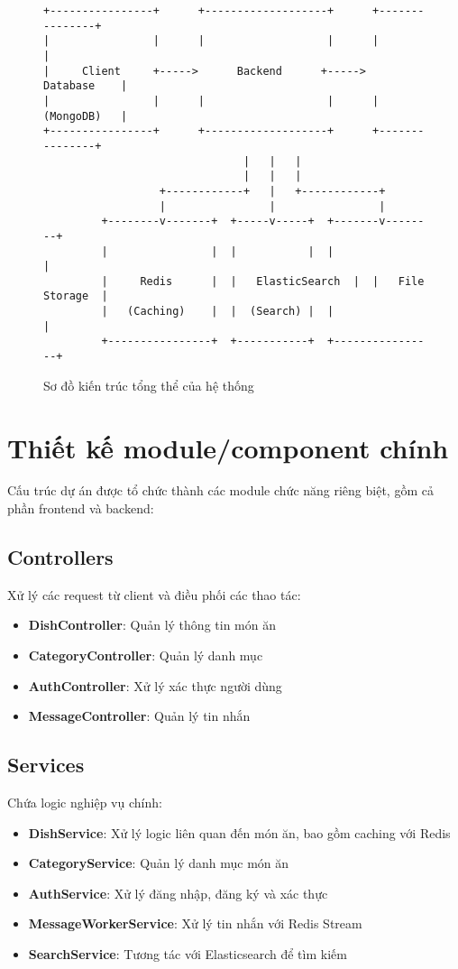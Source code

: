\begin{figure}[H]
\centering
\begin{verbatim}
+----------------+      +-------------------+      +---------------+
|                |      |                   |      |               |
|     Client     +----->      Backend      +----->    Database    |
|                |      |                   |      |   (MongoDB)   |
+----------------+      +-------------------+      +---------------+
                               |   |   |
                               |   |   |
                  +------------+   |   +------------+
                  |                |                |
         +--------v-------+  +-----v-----+  +-------v--------+
         |                |  |           |  |                |
         |     Redis      |  |   ElasticSearch  |  |   File Storage  |
         |   (Caching)    |  |  (Search) |  |                |
         +----------------+  +-----------+  +----------------+
\end{verbatim}
\caption{Sơ đồ kiến trúc tổng thể của hệ thống}
\end{figure}

\section{Thiết kế module/component chính}
Cấu trúc dự án được tổ chức thành các module chức năng riêng biệt, gồm cả phần frontend và backend:

\subsection{Controllers}
Xử lý các request từ client và điều phối các thao tác:
\begin{itemize}
    \item \textbf{DishController}: Quản lý thông tin món ăn
    \item \textbf{CategoryController}: Quản lý danh mục
    \item \textbf{AuthController}: Xử lý xác thực người dùng
    \item \textbf{MessageController}: Quản lý tin nhắn
\end{itemize}

\subsection{Services}
Chứa logic nghiệp vụ chính:
\begin{itemize}
    \item \textbf{DishService}: Xử lý logic liên quan đến món ăn, bao gồm caching với Redis
    \item \textbf{CategoryService}: Quản lý danh mục món ăn
    \item \textbf{AuthService}: Xử lý đăng nhập, đăng ký và xác thực
    \item \textbf{MessageWorkerService}: Xử lý tin nhắn với Redis Stream
    \item \textbf{SearchService}: Tương tác với Elasticsearch để tìm kiếm
\end{itemize}

